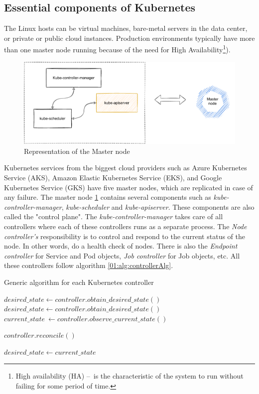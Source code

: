 \subsection{Essential components of Kubernetes}
The Linux hosts can be virtual machines, bare-metal servers in the data center, or private or public cloud instances. Production environments typically have more than one master node running because of the need for High Availability\footnote{High availability (HA) \---\ is the characteristic of the system to run without failing for some period of time.}).
\begin{figure}[!h]
    \centering
    \includegraphics[scale=0.82]{obrazky-figures/02-preliminaries/01-kubernetes/02-architecture-master-sketch.pdf}
    \caption{Representation of the Master node}
    \label{02:fig:masterNode}
\end{figure}
Kubernetes services from the biggest cloud providers such as Azure Kubernetes Service (AKS), Amazon Elastic Kubernetes Service (EKS), and Google Kubernetes Service (GKS) have five master nodes, which are replicated in case of any failure.
The master node \ref{02:fig:masterNode} contains several components such as \emph{kube-controller-manager}, \emph{kube-scheduler} and \emph{kube-apiserver}.
These components are also called the "control plane".
The \emph{kube-controller-manager} takes care of all controllers where each of these controllers runs as a separate process.
The \emph{Node controller's} responsibility is to control and respond to the current status of the node.
In other words, do a health check of nodes.
There is also the \emph{Endpoint controller} for Service and Pod objects, \emph{Job controller} for Job objects, etc.
All these controllers follow algorithm \ref{01:alg:controllerAlg}.
\begin{algorithm}[H]
    \label{01:alg:controllerAlg}
    \caption{Generic algorithm for each Kubernetes controller}

    \begin{algorithmic}[1]
        \State $desired\_state \gets controller.obtain\_desired\_state()$
            \State $desired\_state \gets controller.obtain\_desired\_state()$
            \State $current\_state\ \gets controller.observe\_current\_state()$

                \State $controller.reconcile()$
            \EndIf

            \State $desired\_state \gets current\_state$
        \EndWhile
    \end{algorithmic}
\end{algorithm}
